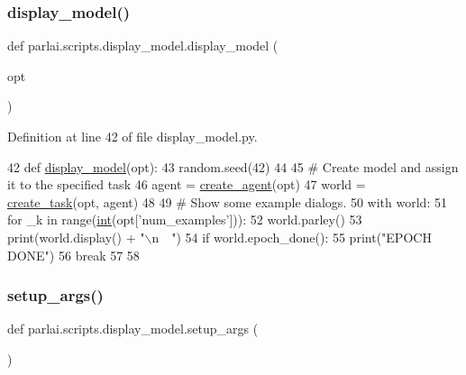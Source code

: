 \subsubsection{\texorpdfstring{display\+\_\+model()}{display\_model()}}
{\footnotesize\ttfamily def parlai.\+scripts.\+display\+\_\+model.\+display\+\_\+model (\begin{DoxyParamCaption}\item[{}]{opt }\end{DoxyParamCaption})}



Definition at line 42 of file display\+\_\+model.\+py.


\begin{DoxyCode}
42 \textcolor{keyword}{def }\hyperlink{namespaceparlai_1_1scripts_1_1display__model_a25488b354b0b8cbaee28b146b17c26f1}{display\_model}(opt):
43     random.seed(42)
44 
45     \textcolor{comment}{# Create model and assign it to the specified task}
46     agent = \hyperlink{namespaceparlai_1_1core_1_1agents_ad0d54074d4bcc148bb415ab5515a53b5}{create\_agent}(opt)
47     world = \hyperlink{namespaceparlai_1_1core_1_1worlds_a11923c10b545c7ecc1b08fe2242d9c2c}{create\_task}(opt, agent)
48 
49     \textcolor{comment}{# Show some example dialogs.}
50     with world:
51         \textcolor{keywordflow}{for} \_k \textcolor{keywordflow}{in} range(\hyperlink{namespacelanguage__model_1_1eval__ppl_a7d12ee00479673c5c8d1f6d01faa272a}{int}(opt[\textcolor{stringliteral}{'num\_examples'}])):
52             world.parley()
53             print(world.display() + \textcolor{stringliteral}{"\(\backslash\)n~~"})
54             \textcolor{keywordflow}{if} world.epoch\_done():
55                 print(\textcolor{stringliteral}{"EPOCH DONE"})
56                 \textcolor{keywordflow}{break}
57 
58 
\end{DoxyCode}
\mbox{\label{namespaceparlai_1_1scripts_1_1display__model_a9141f8dde0f690b4d641fe08c193e2b5}} 
\subsubsection{\texorpdfstring{setup\+\_\+args()}{setup\_args()}}
{\footnotesize\ttfamily def parlai.\+scripts.\+display\+\_\+model.\+setup\+\_\+args (\begin{DoxyParamCaption}{ }\end{DoxyParamCaption})}



